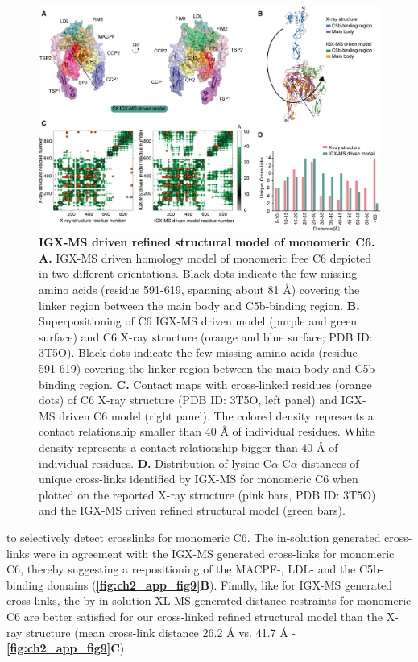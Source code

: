 \begin{figure}[b!]
\center
\includegraphics[width=\textwidth]{Chapter.2/Figures/Fig6.jpg} 
\caption{\textbf{IGX-MS driven refined structural model of monomeric C6.} \textbf{A.} IGX-MS driven homology model of monomeric free C6 depicted in two different orientations. Black dots indicate the few missing amino acids (residue 591-619, spanning about 81 Å) covering the linker region between the main body and C5b-binding region. \textbf{B.} Superpositioning of C6 IGX-MS driven model (purple and green surface) and C6 X-ray structure (orange and blue surface; PDB ID: 3T5O). Black dots indicate the few missing amino acids (residue 591-619) covering the linker region between the main body and C5b-binding region. \textbf{C.} Contact maps with cross-linked residues (orange dots) of C6 X-ray structure (PDB ID: 3T5O, left panel) and IGX-MS driven C6 model (right panel). The colored density represents a contact relationship smaller than 40 Å of individual residues. White density represents a contact relationship bigger than 40 Å of individual residues. \textbf{D.} Distribution of lysine C$\alpha$-C$\alpha$ distances of unique cross-links identified by IGX-MS for monomeric C6 when plotted on the reported X-ray structure (pink bars, PDB ID: 3T5O) and the IGX-MS driven refined structural model (green bars).}
\label{fig:ch2_fig6}
\end{figure}

to selectively detect crosslinks for monomeric C6. The in-solution generated cross-links were in agreement with the IGX-MS generated cross-links for monomeric C6, thereby suggesting a re-positioning of the MACPF-, LDL- and the C5b-binding domains (\textbf{\autoref{fig:ch2_app_fig9}B}). Finally, like for IGX-MS generated cross-links, the by in-solution XL-MS generated distance restraints for monomeric C6 are better satisfied for our cross-linked refined structural model than the X-ray structure (mean cross-link distance 26.2 Å vs. 41.7 Å - \textbf{\autoref{fig:ch2_app_fig9}C}).

